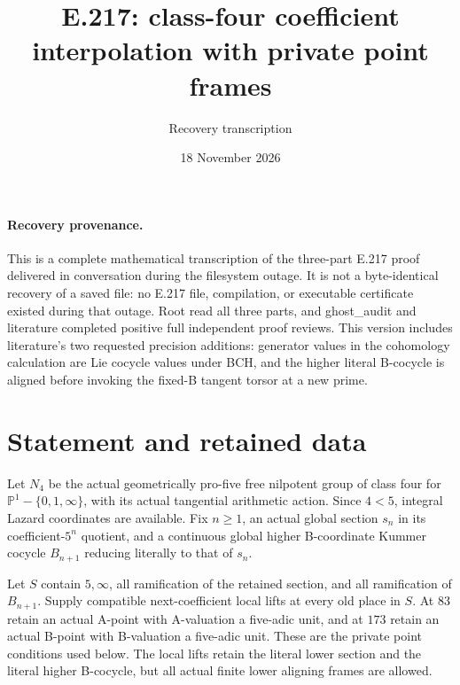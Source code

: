 \documentclass[11pt]{article}
\title{E.217: class-four coefficient interpolation with private point frames}
\author{Recovery transcription}\date{18 November 2026}
\begin{document}
\maketitle
\paragraph{Recovery provenance.}
This is a complete mathematical transcription of the three-part E.217 proof delivered in conversation during the filesystem outage. It is not a byte-identical recovery of a saved file: no E.217 file, compilation, or executable certificate existed during that outage. Root read all three parts, and ghost\_audit and literature completed positive full independent proof reviews. This version includes literature's two requested precision additions: generator values in the cohomology calculation are Lie cocycle values under BCH, and the higher literal B-cocycle is aligned before invoking the fixed-B tangent torsor at a new prime.

\section*{Statement and retained data}
Let $N_4$ be the actual geometrically pro-five free nilpotent group of class four for $\mathbb P^1-\{0,1,\infty\}$, with its actual tangential arithmetic action. Since $4<5$, integral Lazard coordinates are available. Fix $n\ge1$, an actual global section $s_n$ in its coefficient-$5^n$ quotient, and a continuous global higher B-coordinate Kummer cocycle $B_{n+1}$ reducing literally to that of $s_n$.

Let $S$ contain $5,\infty$, all ramification of the retained section, and all ramification of $B_{n+1}$. Supply compatible next-coefficient local lifts at every old place in $S$. At $83$ retain an actual A-point with A-valuation a five-adic unit, and at $173$ retain an actual B-point with B-valuation a five-adic unit. These are the private point conditions used below. The local lifts retain the literal lower section and the literal higher B-cocycle, but all actual finite lower aligning frames are allowed.
\end{document}
